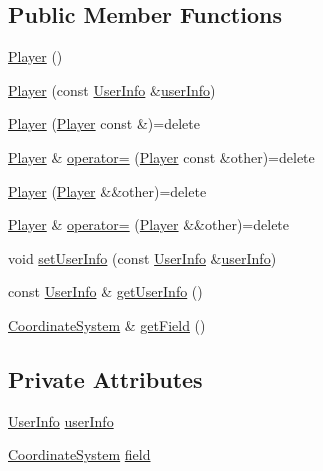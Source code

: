 \subsection*{Public Member Functions}
\begin{DoxyCompactItemize}
\item 
\hyperlink{classMODEL_1_1Player_a244719265958cdd3814a61c97a6e3e98}{Player} ()
\item 
\hyperlink{classMODEL_1_1Player_a6b504bfe315859ffe69a10d3f21829ee}{Player} (const \hyperlink{classUserInfo}{User\+Info} \&\hyperlink{classMODEL_1_1Player_a4ea833995f730252c0bbafea4cf0fdc2}{user\+Info})
\item 
\hyperlink{classMODEL_1_1Player_a85fa038ee81c6c7e1e0a0ecc8304edfd}{Player} (\hyperlink{classMODEL_1_1Player}{Player} const \&)=delete
\item 
\hyperlink{classMODEL_1_1Player}{Player} \& \hyperlink{classMODEL_1_1Player_acf842a8de1ce2116b991b35928c410b9}{operator=} (\hyperlink{classMODEL_1_1Player}{Player} const \&other)=delete
\item 
\hyperlink{classMODEL_1_1Player_aa04e131e23519fa2565393ef59f2291d}{Player} (\hyperlink{classMODEL_1_1Player}{Player} \&\&other)=delete
\item 
\hyperlink{classMODEL_1_1Player}{Player} \& \hyperlink{classMODEL_1_1Player_a96af22c0380c642698eedd0a5112fc33}{operator=} (\hyperlink{classMODEL_1_1Player}{Player} \&\&other)=delete
\item 
void \hyperlink{classMODEL_1_1Player_af9bcbb01780c8dbef6c96c6e75da2442}{set\+User\+Info} (const \hyperlink{classUserInfo}{User\+Info} \&\hyperlink{classMODEL_1_1Player_a4ea833995f730252c0bbafea4cf0fdc2}{user\+Info})
\item 
const \hyperlink{classUserInfo}{User\+Info} \& \hyperlink{classMODEL_1_1Player_a82cbbc06470a73eca6ec268267a9073f}{get\+User\+Info} ()
\item 
\hyperlink{classMODEL_1_1CoordinateSystem}{Coordinate\+System} \& \hyperlink{classMODEL_1_1Player_a705ca7db4cd051354cf500bb7acb266c}{get\+Field} ()
\end{DoxyCompactItemize}
\subsection*{Private Attributes}
\begin{DoxyCompactItemize}
\item 
\hyperlink{classUserInfo}{User\+Info} \hyperlink{classMODEL_1_1Player_a4ea833995f730252c0bbafea4cf0fdc2}{user\+Info}
\item 
\hyperlink{classMODEL_1_1CoordinateSystem}{Coordinate\+System} \hyperlink{classMODEL_1_1Player_a81b1c66a79769f4de04990e7973e1f17}{field}
\end{DoxyCompactItemize}



